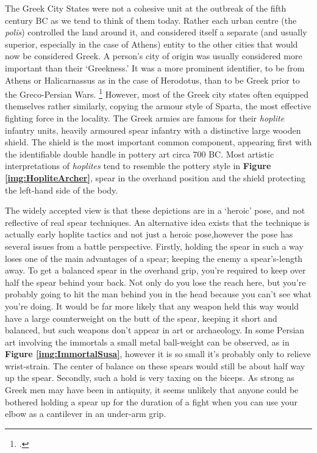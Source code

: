 \documentclass[twoside, a4paper, 12pt]{article}
\begin{document}
The Greek City States were not a cohesive unit at the outbreak of the fifth century
BC as we tend to think of them today. Rather each urban centre (the
\emph{polis}) controlled
the land around it, and considered itself a separate (and usually superior, especially
in the case of Athens)
entity to the other cities that would now be considered Greek. A person's city of
origin was usually considered more important than their `Greekness.' It was
a more prominent identifier, to be from Athens or Halicarnassus
as in the case of Herodotus, than to be Greek prior to the
Greco-Persian Wars.
\footcite{kim_grecopersia_2017}
However, most of the Greek city states often equipped
themselves rather similarly, copying the armour style of Sparta, the most
effective fighting force in the locality.
The Greek armies are famous for their \emph{hoplite} infantry units, heavily
armoured spear infantry with a distinctive large wooden shield. The shield is
the most important common component, appearing first with the
identifiable double handle in pottery art
circa 700 BC.\footnotemark
Most artistic interpretations of \emph{hoplites} tend to resemble the pottery
style in \textbf{Figure \ref{img:HopliteArcher}}, spear in the overhand
position and the shield protecting the left-hand side of the body.

\par\vspace{1em}

The widely
accepted view is that these depictions are in a `heroic' pose, and not
reflective of real spear techniques. An alternative idea exists
that the technique is actually early hoplite tactics and not just a heroic
pose,\footnotemark[\value{footnote}] however the pose has several issues from
a battle perspective.
Firstly, holding the spear in such a way loses one of the main advantages of a
spear; keeping the enemy a spear's-length away.
To get a balanced spear in the overhand grip, you're required
to keep over half the spear behind your back. Not only do you lose the reach here,
but you're probably going to hit the man behind you in the head because you
can't see what you're doing. It would be far more likely that any weapon held
this way would have a large counterweight on the butt of the spear, keeping it short
and balanced, but such weapons don't appear in art or archaeology. In some Persian
art involving the immortals a small metal ball-weight can be observed, as in
\textbf{Figure \ref{img:ImmortalSusa}},
however it is so small it's probably only to relieve wrist-strain. The
center of balance on these spears would still be about half way
up the spear. Secondly,
such a hold is very taxing on the biceps. As strong as Greek men may have been
in antiquity, it seems unlikely that anyone could be bothered holding a spear
up for the duration of a fight when you can use your elbow as a cantilever in
an under-arm grip.
\end{document}
